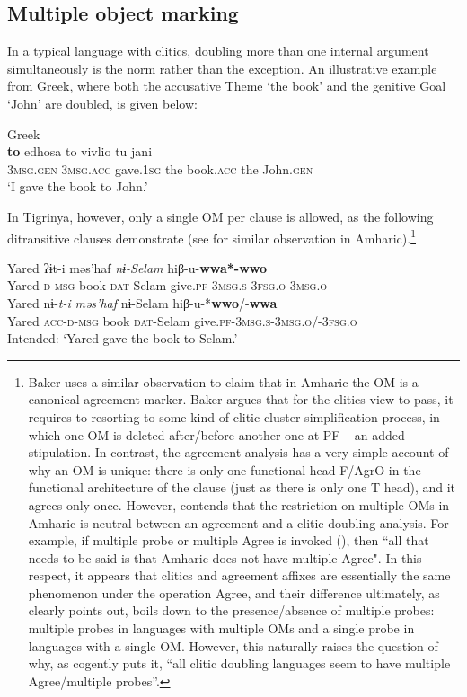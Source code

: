 \documentclass[output=paper]{langscibook}
\begin{document}
\subsection{Multiple object marking}\largerpage

In a typical language with clitics, doubling more than one internal argument simultaneously is the norm rather than the exception. An illustrative example from Greek, where both the accusative Theme `the book' and the genitive Goal `John' are doubled, is given below:

\ea Greek \citep[548]{ana05}\\
 {\textbf{to}} edhosa to vivlio tu jani\\
{\scshape 3msg.gen} {\scshape 3msg.acc} gave.{\scshape 1sg} the book.{\scshape acc} the John.{\scshape gen}\\
\glt `I gave the book to John.' 
\z

\noindent In Tigrinya, however, only a single OM per clause is allowed, as the following ditransitive clauses demonstrate (see \citet[8]{baker12} for similar observation in Amharic).\footnote{Baker uses a similar observation to claim that in Amharic the OM is a canonical agreement marker. Baker argues that for the clitics view to pass, it requires to resorting to some kind of clitic cluster simplification process, in which one OM is deleted after/before another one at PF -- an added stipulation. In contrast, the agreement analysis has a very simple account of why an OM is unique: there is only one functional head F/AgrO in the functional architecture of the clause (just as there is only one T head), and it agrees only once. However, \citep[624--625]{kramer14} contends that the restriction on multiple OMs in Amharic is neutral between an agreement and a clitic doubling analysis. For example, if multiple probe or multiple Agree is invoked (\citealt{hiraiwa05}), then ``all that needs to be said is that Amharic does not have multiple Agree". In this respect, it appears that clitics and agreement affixes are essentially the same phenomenon under the operation Agree, and their difference ultimately, as \citealt{kramer14} clearly points out, boils down to the presence/absence of multiple probes: multiple probes in languages with multiple OMs and a single probe in languages with a single OM. However, this naturally raises the question of why, as \citep[626]{kramer14} cogently puts it, ``all clitic doubling languages seem to have multiple Agree/multiple probes''.} 


\ea\label{ex:Gebregziabher:double-obj} 
\ea\label{ex:Gebregziabher:double1} 
\gll Yared ʔɨt-i məs'haf \textit{nɨ-Selam} hiβ-u-\textbf{wwa*-wwo} \\
Yared {\scshape d-msg} book {\scshape dat-}Selam give.{\scshape pf-3msg.s-3fsg.o}{\scshape -3msg.o}\\
\ex\label{ex:Gebregziabher:double2} 
\gll Yared nɨ-\textit{t-i} \textit{məs'haf} nɨ-Selam hiβ-u-*\textbf{wwo}/-\textbf{wwa} \\
Yared {\scshape acc}-{\scshape d-msg} book {\scshape dat-}Selam give.{\scshape pf-3msg.s-3msg.o}/-{\scshape 3fsg.o} \\
\glt Intended: `Yared gave the book to Selam.'
\z
\z\largerpage
\end{document}
